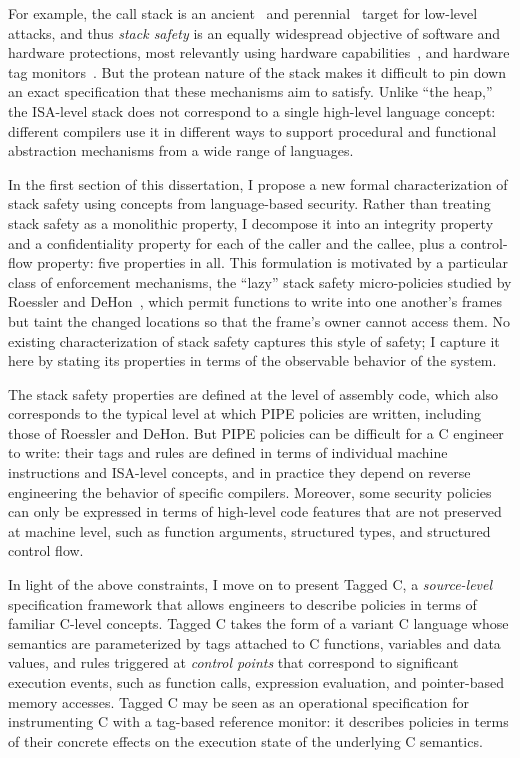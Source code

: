 \documentclass{report}
\begin{document}
For example, the call stack is an ancient~\cite{phrack96:smashingthestack} and
perennial~\cite{mitre-cwe,DBLP:conf/raid/VeendCB12,
  DBLP:conf/sp/SzekeresPWS13,
  DBLP:conf/sp/HuSACSL16,msrc-bluehat,chromium-security}
target for low-level attacks, and thus {\em stack safety} is an equally
widespread objective of software and hardware protections, most relevantly
%
using hardware capabilities~\cite{Woodruff+14,Chisnall+15,
  SkorstengaardLocal,SkorstengaardSTKJFP,Georges22:TempsDesCerises},
and hardware tag monitors~\cite{DBLP:conf/sp/RoesslerD18,Gollapudi+23}.
But the protean nature of the stack makes it difficult to pin down an
exact specification that these mechanisms aim to satisfy.
Unlike ``the heap,'' the ISA-level stack does not correspond to a single
high-level language concept: different compilers use it in different
ways to support procedural and functional abstraction mechanisms from
a wide range of languages.

In the first section of this dissertation,
I propose a new formal characterization of stack safety using concepts
from language-based security. Rather than treating
stack safety as a monolithic property, I decompose it into an
integrity property and a confidentiality property for each of the
caller and the callee, plus a control-flow property: five properties
in all.
%
This formulation is motivated by a particular class of enforcement
mechanisms, the ``lazy'' stack safety micro-policies studied by
Roessler and DeHon~\cite{DBLP:conf/sp/RoesslerD18}, which permit
functions to write into one another's frames but taint the
changed locations so that the frame's owner cannot access them. No
existing characterization of stack safety captures this style of
safety; I capture it here by stating its properties in terms of the
observable behavior of the system.

The stack safety properties are defined at the level of assembly code,
which also corresponds to the typical level at which PIPE policies are written,
including those of Roessler and DeHon.
But PIPE policies can be difficult for a C engineer to write: their tags and rules
are defined in terms of individual machine instructions and ISA-level
concepts, and in practice they depend on reverse engineering the behavior
of specific compilers.
Moreover, some security policies can only be expressed in terms of high-level code
features that are not preserved at machine level, such as function
arguments, structured types, and structured control flow.

In light of the above constraints, I move on to present Tagged C, a \emph{source-level}
specification framework that allows engineers to describe policies in terms of familiar
C-level concepts. Tagged C takes the form of a variant C language whose semantics are
parameterized by tags attached to C functions, variables and data values, and rules triggered at
\emph{control points} that correspond to significant execution events, such as function calls,
expression evaluation, and pointer-based memory accesses.
Tagged C may be seen as an operational specification for instrumenting C with a
tag-based reference monitor: it describes policies in terms of their concrete effects
on the execution state of the underlying C semantics.
\end{document}
